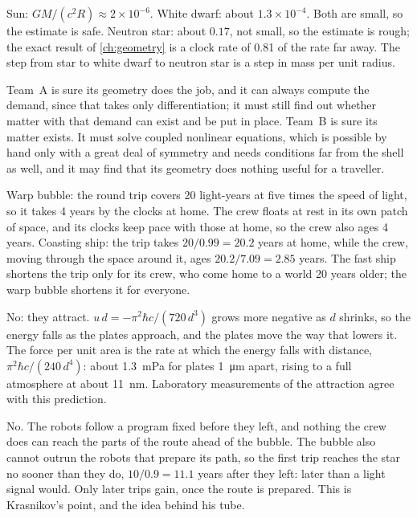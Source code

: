 \begin{checkanswers}
\item[\ref{chk:sun-ns}] Sun: $GM/(c^{2}R) \approx 2\times10^{-6}$. White dwarf:
  about $1.3\times10^{-4}$. Both are small, so the estimate is safe. Neutron
  star: about $0.17$, not small, so the estimate is rough; the exact result of
  \cref{ch:geometry} is a clock rate of 0.81 of the rate far away. The step
  from star to white dwarf to neutron star is a step in mass per unit radius.
\item[\ref{chk:division}] Team~A is sure its geometry does the job, and it can
  always compute the demand, since that takes only differentiation; it must
  still find out whether matter with that demand can exist and be put in
  place. Team~B is sure its matter exists. It must solve coupled nonlinear
  equations, which is possible by hand only with a great deal of symmetry and
  needs conditions far from the shell as well, and it may find that its
  geometry does nothing useful for a traveller.
\item[\ref{chk:warp-aging}] Warp bubble: the round trip covers 20 light-years at
  five times the speed of light, so it takes 4 years by the clocks at home.
  The crew floats at rest in its own patch of space, and its clocks keep pace
  with those at home, so the crew also ages 4 years. Coasting ship: the trip
  takes $20/0.99 = 20.2$ years at home, while the crew, moving through the
  space around it, ages $20.2/7.09 = 2.85$ years. The fast ship shortens the
  trip only for its crew, who come home to a world 20 years older; the warp
  bubble shortens it for everyone.
\item[\ref{chk:casimir-force}] No: they attract.
  $u\,d = -\pi^{2}\hbar c/(720\,d^{3})$ grows more negative as $d$ shrinks, so
  the energy falls as the plates approach, and the plates move the way that
  lowers it. The force per unit area is the rate at which the energy falls
  with distance, $\pi^{2}\hbar c/(240\,d^{4})$: about \SI{1.3}{\milli\pascal}
  for plates \SI{1}{\micro\metre} apart, rising to a full atmosphere at about
  \SI{11}{\nano\metre}. Laboratory measurements of the attraction agree with
  this prediction.
\item[\ref{chk:krasnikov-control}] No. The robots follow a program fixed
  before they left, and nothing the crew does can reach the parts of the route
  ahead of the bubble. The bubble also cannot outrun the robots that prepare
  its path, so the first trip reaches the star no sooner than they do,
  $10/0.9 = 11.1$ years after they left: later than a light signal would.
  Only later trips gain, once the route is prepared. This is Krasnikov's
  point, and the idea behind his tube.
\end{checkanswers}


